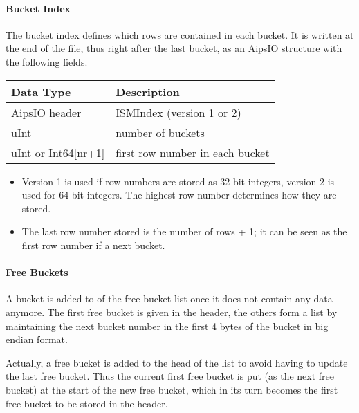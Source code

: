 \paragraph{Bucket Index\\}
The bucket index defines which rows are contained in each bucket.
It is written at the end of the file, thus right after the last bucket, as
an AipsIO structure with the following fields.

\vspace{0.15in}
\begin{tabular}{|l|p{13cm}|} \hline
  Data Type & Description \\ \hline\hline
  AipsIO header & ISMIndex (version 1 or 2) \\
  uInt & number of buckets \\
  uInt or Int64[nr+1] & first row number in each bucket \\
  \hline
\end{tabular}
\vspace{0.15in}

\begin{itemize}
\item Version 1 is used if row numbers are stored as 32-bit integers,
  version 2 is used for 64-bit integers. The highest row number
  determines how they are stored.
\item The last row number stored is the number of rows + 1; it can be
  seen as the first row number if a next bucket.
\end{itemize}

\paragraph{Free Buckets\\}
A bucket is added to of the free bucket list once it does not contain any
  data anymore.
The first free bucket is given in the header, the others form a list
  by maintaining the next bucket number in the first 4 bytes of the
  bucket in big endian format.

Actually, a free bucket is added to the head of the list to avoid having to update
  the last free bucket. Thus the current first free bucket is put (as
  the next free bucket) at
  the start of the new free bucket, which in its turn becomes the
  first free bucket to be stored in the header.


